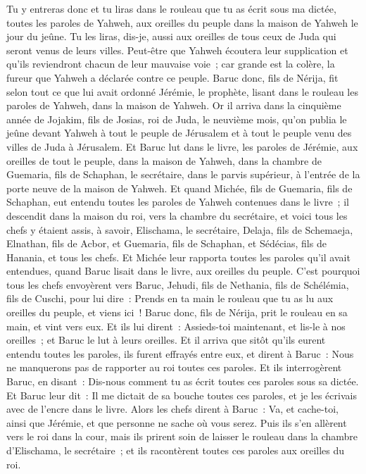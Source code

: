\begin{multicols}{2}
Tu y entreras donc et tu liras dans le rouleau que tu as écrit sous ma dictée, toutes les paroles de Yahweh, aux oreilles du peuple dans la maison de Yahweh le jour du jeûne. Tu les liras, dis-je, aussi aux oreilles de tous ceux de Juda qui seront venus de leurs villes.
Peut-être que Yahweh écoutera leur supplication et qu'ils reviendront chacun de leur mauvaise voie~; car grande est la colère, la fureur que Yahweh a déclarée contre ce peuple.
Baruc donc, fils de Nérija, fit selon tout ce que lui avait ordonné Jérémie, le prophète, lisant dans le rouleau les paroles de Yahweh, dans la maison de Yahweh.
Or il arriva dans la cinquième année de Jojakim, fils de Josias, roi de Juda, le neuvième mois, qu'on publia le jeûne devant Yahweh à tout le peuple de Jérusalem et à tout le peuple venu des villes de Juda à Jérusalem.
Et Baruc lut dans le livre, les paroles de Jérémie, aux oreilles de tout le peuple, dans la maison de Yahweh, dans la chambre de Guemaria, fils de Schaphan, le secrétaire, dans le parvis supérieur, à l'entrée de la porte neuve de la maison de Yahweh.
Et quand Michée, fils de Guemaria, fils de Schaphan, eut entendu toutes les paroles de Yahweh contenues dans le livre~;
il descendit dans la maison du roi, vers la chambre du secrétaire, et voici tous les chefs y étaient assis, à savoir, Elischama, le secrétaire, Delaja, fils de Schemaeja, Elnathan, fils de Acbor, et Guemaria, fils de Schaphan, et Sédécias, fils de Hanania, et tous les chefs.
Et Michée leur rapporta toutes les paroles qu'il avait entendues, quand Baruc lisait dans le livre, aux oreilles du peuple.
C'est pourquoi tous les chefs envoyèrent vers Baruc, Jehudi, fils de Nethania, fils de Schélémia, fils de Cuschi, pour lui dire~: Prends en ta main le rouleau que tu as lu aux oreilles du peuple, et viens ici~! Baruc donc, fils de Nérija, prit le rouleau en sa main, et vint vers eux.
Et ils lui dirent~: Assieds-toi maintenant, et lis-le à nos oreilles~; et Baruc le lut à leurs oreilles.
Et il arriva que sitôt qu'ils eurent entendu toutes les paroles, ils furent effrayés entre eux, et dirent à Baruc~: Nous ne manquerons pas de rapporter au roi toutes ces paroles.
Et ils interrogèrent Baruc, en disant~: Dis-nous comment tu as écrit toutes ces paroles sous sa dictée.
Et Baruc leur dit~: Il me dictait de sa bouche toutes ces paroles, et je les écrivais avec de l'encre dans le livre.
Alors les chefs dirent à Baruc~: Va, et cache-toi, ainsi que Jérémie, et que personne ne sache où vous serez.
Puis ils s'en allèrent vers le roi dans la cour, mais ils prirent soin de laisser le rouleau dans la chambre d'Elischama, le secrétaire~; et ils racontèrent toutes ces paroles aux oreilles du roi.

\end{multicols}
